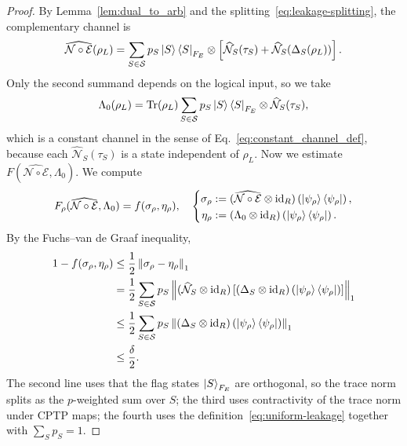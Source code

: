 \documentclass[11pt,letterpaper]{article}
\theoremstyle{plain}
\theoremstyle{plain}
\theoremstyle{plain}
\theoremstyle{plain}
\theoremstyle{plain}
\theoremstyle{plain}
\theoremstyle{plain}
\theoremstyle{definition}
\theoremstyle{plain}
\begin{document}
\begin{proof}
    By Lemma~\ref{lem:dual_to_arb} and the splitting~\eqref{eq:leakage-splitting}, the complementary channel is
    \[
        \widehat{\mathcal N\circ\mathcal E}(\rho_L)
        =
        \sum_{S\in\mathcal S}
        p_S
        \ket S\bra S_{F_E}
        \otimes
        \left[
            \widehat{\mathcal N}_S(\tau_S)
            +
            \widehat{\mathcal N}_S(\Delta_S(\rho_L))
        \right].
    \]
    Only the second summand depends on the logical input, so we take
    \[
        \Lambda_0(\rho_L)
        =
        \operatorname{Tr}(\rho_L)
        \sum_{S\in\mathcal S}
        p_S
        \ket S\bra S_{F_E}
        \otimes
        \widehat{\mathcal N}_S(\tau_S),
    \]
    which is a constant channel in the sense of Eq.~\eqref{eq:constant_channel_def}, because each $\widehat{\mathcal N}_S(\tau_S)$ is a state independent of $\rho_L$. 
    Now we estimate $F(\widehat{\mathcal N\circ\mathcal E},\Lambda_0)$.  We compute
    \[
        F_\rho(\widehat{\mathcal N\circ\mathcal E},\Lambda_0)
        =
        f(\sigma_\rho,\eta_\rho),
        \quad
        \left\{
        \begin{aligned}
        \sigma_\rho
        &:=
        (\widehat{\mathcal N\circ\mathcal E}\otimes \mathrm{id}_R)
        \left(\ket{\psi_\rho}\bra{\psi_\rho}\right),\\
        \eta_\rho
        &:=
        (\Lambda_0\otimes \mathrm{id}_R)
        \left(\ket{\psi_\rho}\bra{\psi_\rho}\right).
        \end{aligned}
        \right.
    \]
    By the Fuchs--van de Graaf inequality,
    \[
    \begin{aligned}
    1-f(\sigma_\rho,\eta_\rho)
    &\leq
    \frac{1}{2}
    \left\|
        \sigma_\rho-\eta_\rho
    \right\|_1
    \\
    &=
    \frac{1}{2}
    \sum_{S\in\mathcal S}
    p_S
    \left\|
    (\widehat{\mathcal N}_S\otimes \mathrm{id}_R)
    \left[
        (\Delta_S\otimes \mathrm{id}_R)
        \left(\ket{\psi_\rho}\bra{\psi_\rho}\right)
    \right]
    \right\|_1
    \\
    &\leq
    \frac{1}{2}
    \sum_{S\in\mathcal S}
    p_S
    \left\|
        (\Delta_S\otimes \mathrm{id}_R)
        \left(\ket{\psi_\rho}\bra{\psi_\rho}\right)
    \right\|_1
    \\
    &\leq
    \frac{\delta}{2}.
    \end{aligned}
    \]
    The second line uses that the flag states $\ket S_{F_E}$ are orthogonal, so the trace norm splits as the $p$-weighted sum over $S$; 
    the third uses contractivity of the trace norm under CPTP maps; the fourth uses the definition~\eqref{eq:uniform-leakage} together with $\sum_Sp_S=1$.


\end{proof}
\end{document}
